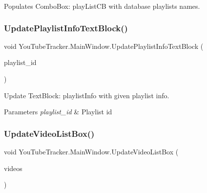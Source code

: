 Populates Combo\+Box\+: {\ttfamily play\+List\+CB} with database playlists\textquotesingle{} names. 

\mbox{\label{class_you_tube_tracker_1_1_main_window_a0f16b6bca0c659f84e23615a938fc3b5}} 
\subsubsection{\texorpdfstring{Update\+Playlist\+Info\+Text\+Block()}{UpdatePlaylistInfoTextBlock()}}
{\footnotesize\ttfamily void You\+Tube\+Tracker.\+Main\+Window.\+Update\+Playlist\+Info\+Text\+Block (\begin{DoxyParamCaption}\item[{int}]{playlist\+\_\+id }\end{DoxyParamCaption})\hspace{0.3cm}{\ttfamily [inline]}}



Update Text\+Block\+: {\ttfamily playlist\+Info} with given playlist info. 


\begin{DoxyParams}{Parameters}
{\em playlist\+\_\+id} & Playlist id\\
\hline
\end{DoxyParams}
\mbox{\label{class_you_tube_tracker_1_1_main_window_ae42b5a4f3b7d6e720ef2825f6786512d}} 
\subsubsection{\texorpdfstring{Update\+Video\+List\+Box()}{UpdateVideoListBox()}}
{\footnotesize\ttfamily void You\+Tube\+Tracker.\+Main\+Window.\+Update\+Video\+List\+Box (\begin{DoxyParamCaption}\item[{List$<$ \mbox{\hyperlink{struct_you_tube_tracker_1_1_video_data}{Video\+Data}} $>$}]{videos }\end{DoxyParamCaption})\hspace{0.3cm}{\ttfamily [inline]}}




